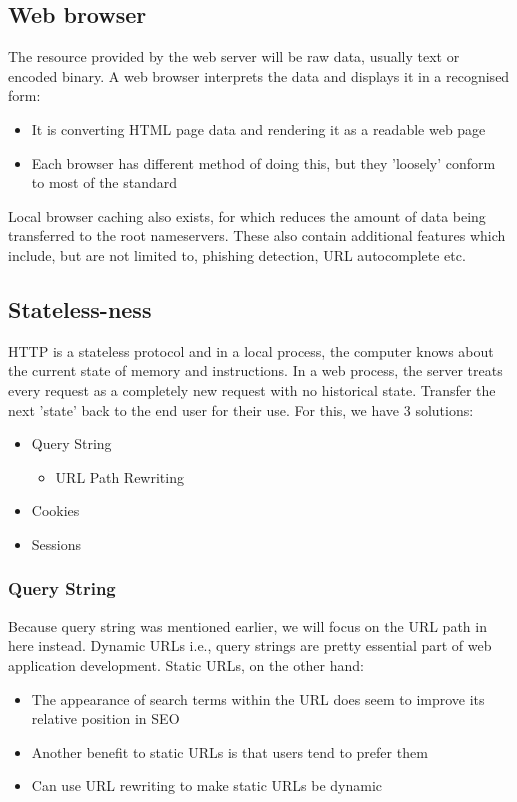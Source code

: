 \documentclass[a4paper]{article}
\theoremstyle{plain}
\theoremstyle{definition}
\theoremstyle{remark}
\begin{document}
\begin{flushleft}
	\subsection{Web browser}
	The resource provided by the web server will be raw data, usually text or encoded binary. A web browser interprets the data and displays it in a recognised form:
	\begin{itemize}
		\item It is converting HTML page data and rendering it as a readable web page
		\item Each browser has different method of doing this, but they 'loosely' conform to most of the standard
	\end{itemize}
	Local browser caching also exists, for which reduces the amount of data being transferred to the root nameservers. These also contain additional features which include, but are not limited to, phishing detection, URL autocomplete etc.
	\subsection{Stateless-ness}
	HTTP is a stateless protocol and in a local process, the computer knows about the current state of memory and instructions. In a web process, the server treats every request as a completely new request with no historical state. Transfer the next 'state' back to the end user for their use. For this, we have 3 solutions:
	\begin{itemize}
		\item Query String
			\begin{itemize}
				\item URL Path Rewriting
			\end{itemize}
		\item Cookies
		\item Sessions
	\end{itemize}
	\subsubsection{Query String}
	Because query string was mentioned earlier, we will focus on the URL path in here instead. Dynamic URLs i.e., query strings are pretty essential part of web application development. Static URLs, on the other hand:
	\begin{itemize}
		\item The appearance of search terms within the URL does seem to improve its relative position in SEO
		\item Another benefit to static URLs is that users tend to prefer them
		\item Can use URL rewriting to make static URLs be dynamic
	\end{itemize}

\end{flushleft}
\end{document}
